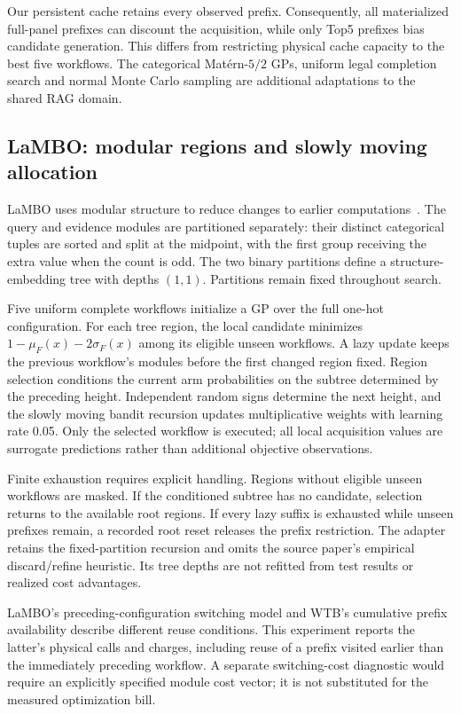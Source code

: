 Our persistent cache retains every observed prefix. Consequently, all
materialized full-panel prefixes can discount the acquisition, while only
Top5 prefixes bias candidate generation. This differs from restricting
physical cache capacity to the best five workflows. The categorical
Mat\'ern-$5/2$ GPs, uniform legal completion search and normal Monte Carlo
sampling are additional adaptations to the shared RAG domain.

\subsection{LaMBO: modular regions and slowly moving allocation}
\label{sec:lambo-rag-adapter}
LaMBO uses modular structure to reduce changes to earlier
computations~\citep{lin2021lambo}. The query and evidence modules are
partitioned separately: their distinct categorical tuples are sorted and
split at the midpoint, with the first group receiving the extra value when
the count is odd. The two binary partitions define a structure-embedding
tree with depths $(1,1)$. Partitions remain fixed throughout search.

Five uniform complete workflows initialize a GP over the full one-hot
configuration. For each tree region, the local candidate minimizes
$1-\mu_F(x)-2\sigma_F(x)$ among its eligible unseen workflows. A lazy
update keeps the previous workflow's modules before the first changed
region fixed. Region selection conditions the current arm probabilities
on the subtree determined by the preceding height. Independent random
signs determine the next height, and the slowly moving bandit recursion
updates multiplicative weights with learning rate 0.05. Only the selected
workflow is executed; all local acquisition values are surrogate
predictions rather than additional objective observations.

Finite exhaustion requires explicit handling. Regions without eligible
unseen workflows are masked. If the conditioned subtree has no candidate,
selection returns to the available root regions. If every lazy suffix is
exhausted while unseen prefixes remain, a recorded root reset releases
the prefix restriction. The adapter retains the fixed-partition recursion
and omits the source paper's empirical discard/refine heuristic. Its tree
depths are not refitted from test results or realized cost advantages.

LaMBO's preceding-configuration switching model and WTB's cumulative
prefix availability describe different reuse conditions. This experiment
reports the latter's physical calls and charges, including reuse of a
prefix visited earlier than the immediately preceding workflow. A separate
switching-cost diagnostic would require an explicitly specified module
cost vector; it is not substituted for the measured optimization bill.

